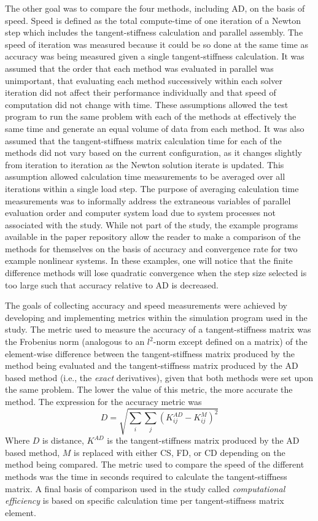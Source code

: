 \documentclass[preprint,12pt]{elsarticle}
\begin{document}
The other goal was to compare the four methods, including AD, on the basis of speed. Speed is defined as the total compute-time of one iteration of a Newton step which includes the tangent-stiffness calculation and parallel assembly. The speed of iteration was measured because it could be so done at the same time as accuracy was being measured given a single tangent-stiffness calculation.  It was assumed that the order that each method was evaluated in parallel was unimportant, that evaluating each method successively within each solver iteration did not affect their performance individually and that speed of computation did not change with time. These assumptions allowed the test program to run the same problem with each of the methods at effectively the same time and generate an equal volume of data from each method. It was also assumed that the tangent-stiffness matrix calculation time for each of the methods did not vary based on the current configuration, as it changes slightly from iteration to iteration as the Newton solution iterate is updated.  This assumption allowed calculation time measurements to be averaged over all iterations within a single load step. The purpose of averaging calculation time measurements was to informally address the extraneous variables of parallel evaluation order and computer system load due to system processes not associated with the study. While not part of the study, the example programs available in the paper repository allow the reader to make a comparison of the methods for themselves on the basis of accuracy and convergence rate for two example nonlinear systems. In these examples, one will notice that the finite difference methods will lose quadratic convergence when the step size selected is too large such that accuracy relative to AD is decreased.

The goals of collecting accuracy and speed measurements were achieved by developing and implementing metrics within the simulation program used in the study. The metric used to measure the accuracy of a tangent-stiffness matrix was the Frobenius norm (analogous to an $l^2$-norm except defined on a matrix) of the element-wise difference between the tangent-stiffness matrix produced by the method being evaluated and the tangent-stiffness matrix produced by the AD based method (i.e., the \emph{exact} derivatives), given that both methods were set upon the same problem. The lower the value of this metric, the more accurate the method. The expression for the accuracy metric was
%
\begin{equation} 
  D = \sqrt{\sum_i \sum_j(K^{AD}_{ij} - K^{M}_{ij})^2}
  \label{eqn:accuracy}
\end{equation}
%
Where $D$ is distance, $K^{AD}$ is the tangent-stiffness matrix produced by the AD based method, $M$ is replaced with either CS, FD, or CD depending on the method being compared.  The metric used to compare the speed of the different methods was the time in seconds required to calculate the tangent-stiffness matrix. A final basis of comparison used in the study called \emph{computational efficiency} is based on specific calculation time per tangent-stiffness matrix element.
\end{document}
